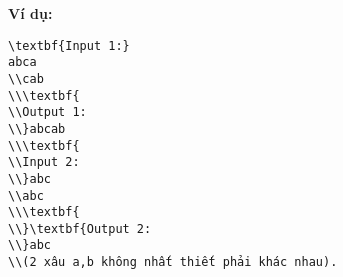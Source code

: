\textbf{    Ví dụ:   }
\begin{verbatim}
\textbf{Input 1:}
abca
\\cab
\\\textbf{
\\Output 1:
\\}abcab
\\\textbf{
\\Input 2:
\\}abc
\\abc
\\\textbf{
\\}\textbf{Output 2:
\\}abc
\\(2 xâu a,b không nhất thiết phải khác nhau).\end{verbatim}